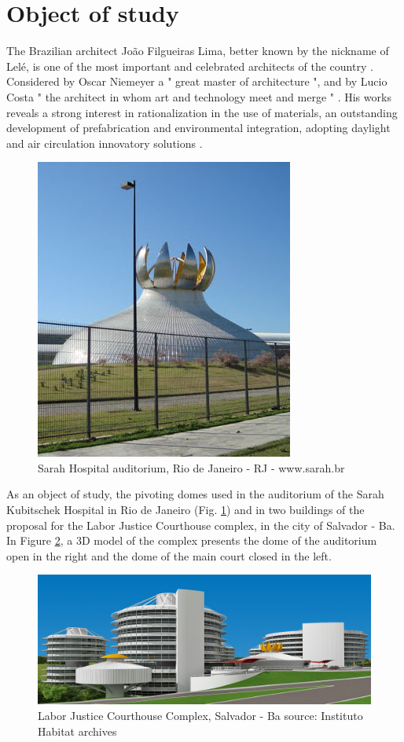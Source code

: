 \documentclass[preprint,12pt,3p]{elsarticle}
\begin{document}
\section{Object of study}
\label{obstudy}

The Brazilian architect Jo\~ao Filgueiras Lima, better known by the nickname of Lel\'e, is one of the most important and celebrated architects of the country \cite{ARQ:359533}. Considered by Oscar Niemeyer a " great master of architecture ", and by Lucio Costa " the architect in whom art and technology meet and merge " \cite{ferraz2000joão}. His works reveals a strong interest in rationalization in the use of materials, an outstanding development of prefabrication and environmental integration, adopting daylight and air circulation innovatory solutions \cite{Campagnol2014}
 \cite{Maciel2007}.

\begin{figure}[!h]
\begin{center}
\includegraphics[width=0.3
\textwidth]{sarahcupula.jpg}
\caption{Sarah Hospital auditorium, Rio de Janeiro - RJ  -  www.sarah.br}
\label{figura:sarah}
\end{center}
\end{figure}

As an object of study, the pivoting domes used in the auditorium of the Sarah Kubitschek Hospital in Rio de Janeiro (Fig. \ref{figura:sarah}) and in two buildings of the proposal for the Labor Justice Courthouse complex, in the city of Salvador - Ba. In Figure \ref{figura:trt}, a 3D model of the complex presents the dome of the auditorium open in the right and the dome of the main court closed in the left.


\begin{figure}
\begin{center}
\includegraphics[width=0.7
\textwidth]{trt.jpg}
\caption{Labor Justice Courthouse Complex, Salvador - Ba source: Instituto Habitat archives}
\label{figura:trt}
\end{center}
\end{figure}
\end{document}
